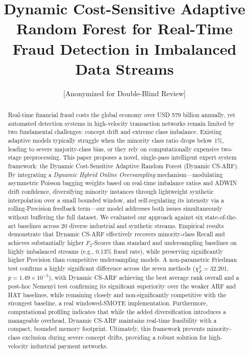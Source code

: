 \documentclass[review,12pt]{elsarticle}
\begin{document}
\begin{frontmatter}

\title{Dynamic Cost-Sensitive Adaptive Random Forest for Real-Time Fraud Detection in Imbalanced Data Streams}

\author{[Anonymized for Double-Blind Review]}

\begin{abstract}
Real-time financial fraud costs the global economy over USD 579 billion annually, yet automated detection systems in high-velocity transaction networks remain limited by two fundamental challenges: concept drift and extreme class imbalance. Existing adaptive models typically struggle when the minority class ratio drops below 1\%, leading to severe majority-class bias, or they rely on computationally expensive two-stage preprocessing. This paper proposes a novel, single-pass intelligent expert system framework: the Dynamic Cost-Sensitive Adaptive Random Forest (Dynamic CS-ARF). By integrating a \textit{Dynamic Hybrid Online Oversampling} mechanism---modulating asymmetric Poisson bagging weights based on real-time imbalance ratios and ADWIN drift confidence, diversifying minority instances through lightweight synthetic interpolation over a small bounded window, and self-regulating its intensity via a rolling-Precision feedback term---our model addresses both issues simultaneously without buffering the full dataset. We evaluated our approach against six state-of-the-art baselines across 20 diverse industrial and synthetic streams. Empirical results demonstrate that Dynamic CS-ARF effectively recovers minority-class Recall and achieves substantially higher $F_2$-Scores than standard and undersampling baselines on highly imbalanced streams (e.g., 0.13\% fraud rate), while preserving significantly higher Precision than competitive undersampling models. A non-parametric Friedman test confirms a highly significant difference across the seven methods ($\chi^2_F=32.201$, $p=1.49\times10^{-5}$), with Dynamic CS-ARF achieving the best average rank overall and a post-hoc Nemenyi test confirming its significant superiority over the weaker ARF and HAT baselines, while remaining closely and non-significantly competitive with the strongest baseline, a real windowed-SMOTE implementation. Furthermore, computational profiling indicates that while the added diversification introduces a manageable overhead, Dynamic CS-ARF maintains real-time feasibility with a compact, bounded memory footprint. Ultimately, this framework prevents minority-class exclusion during severe concept drifts, providing a robust solution for high-velocity industrial payment networks.
\end{abstract}


\end{frontmatter}
\end{document}
